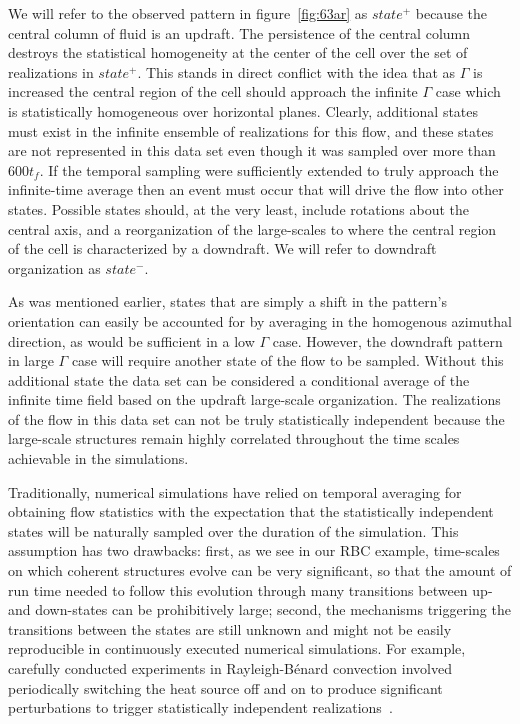 \documentclass[twocolumn,10pt]{tsfp}
\begin{document}
We will refer to the observed pattern in figure~\ref{fig:63ar} as $state^+$ because the central column of fluid is an updraft. The persistence of the central column destroys the statistical homogeneity at the center of the cell over the set of realizations in $state^+$. This stands in direct conflict with the idea that as $\Gamma$ is increased the central region of the cell should approach the infinite $\Gamma$ case which is statistically homogeneous over horizontal planes. Clearly, additional states must exist in the infinite ensemble of realizations for this flow, and these states are not represented in this data set even though it was sampled over more than 600$t_f$.  If the temporal sampling were sufficiently extended to truly approach the infinite-time average then an event must occur that will drive the flow into other states.  Possible states should, at the very least, include rotations about the central axis, and a reorganization of the large-scales to where the central region of the cell is characterized by a downdraft.  We will refer to downdraft organization as $state^-$. 


As was mentioned earlier, states that are simply a shift in the pattern's orientation can easily be accounted for by averaging in the homogenous azimuthal direction, as would be sufficient in a low $\Gamma$ case. However, the downdraft pattern in large $\Gamma$ case will require another state of the flow to be sampled. Without this additional state the data set can be considered a conditional average of the infinite time field based on the updraft large-scale organization.  The realizations of the flow in this data set can not be truly statistically independent because the large-scale structures remain highly correlated throughout the time scales achievable in the simulations.

 Traditionally, numerical simulations have relied on temporal averaging for obtaining flow statistics with the expectation that the statistically independent states will be naturally sampled over the duration of the simulation. %
 This assumption has two drawbacks: first, as we see in our RBC example, time-scales on which coherent structures evolve can be very significant, so that the amount of run time needed to follow this evolution through many transitions between up- and down-states can be prohibitively large; second, the mechanisms triggering the transitions between the states are still unknown and might not be easily reproducible in continuously executed numerical simulations. For example, carefully conducted experiments in Rayleigh-B\'{e}nard convection involved periodically switching the heat source off and on to produce significant perturbations to trigger statistically independent realizations~\citep{fernandes2001spatial, fernandes2002scaling}.
  
\end{document}
